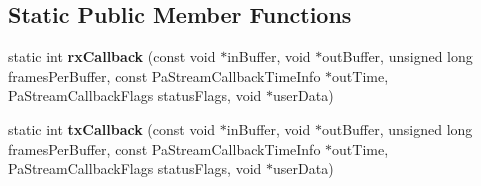 \subsection*{Static Public Member Functions}
\begin{DoxyCompactItemize}
\item 
\hypertarget{class_main_frame_a45e054e7f42f10088a699821a169d295}{static int {\bfseries rx\-Callback} (const void $\ast$in\-Buffer, void $\ast$out\-Buffer, unsigned long frames\-Per\-Buffer, const Pa\-Stream\-Callback\-Time\-Info $\ast$out\-Time, Pa\-Stream\-Callback\-Flags status\-Flags, void $\ast$user\-Data)}\label{class_main_frame_a45e054e7f42f10088a699821a169d295}

\item 
\hypertarget{class_main_frame_afca7a385e843876355c50833e5ea4edb}{static int {\bfseries tx\-Callback} (const void $\ast$in\-Buffer, void $\ast$out\-Buffer, unsigned long frames\-Per\-Buffer, const Pa\-Stream\-Callback\-Time\-Info $\ast$out\-Time, Pa\-Stream\-Callback\-Flags status\-Flags, void $\ast$user\-Data)}\label{class_main_frame_afca7a385e843876355c50833e5ea4edb}

\end{DoxyCompactItemize}
